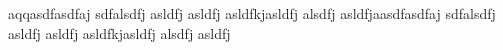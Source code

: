 aqqasdfasdfaj sdfalsdfj asldfj asldfj asldfkjasldfj alsdfj asldfjaasdfasdfaj sdfalsdfj asldfj asldfj asldfkjasldfj alsdfj asldfj
